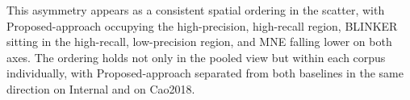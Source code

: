 This asymmetry appears as a consistent spatial ordering in the scatter, with Proposed-approach occupying the high-precision, high-recall region, BLINKER sitting in the high-recall, low-precision region, and MNE falling lower on both axes. The ordering holds not only in the pooled view but within each corpus individually, with Proposed-approach separated from both baselines in the same direction on Internal and on Cao2018.

